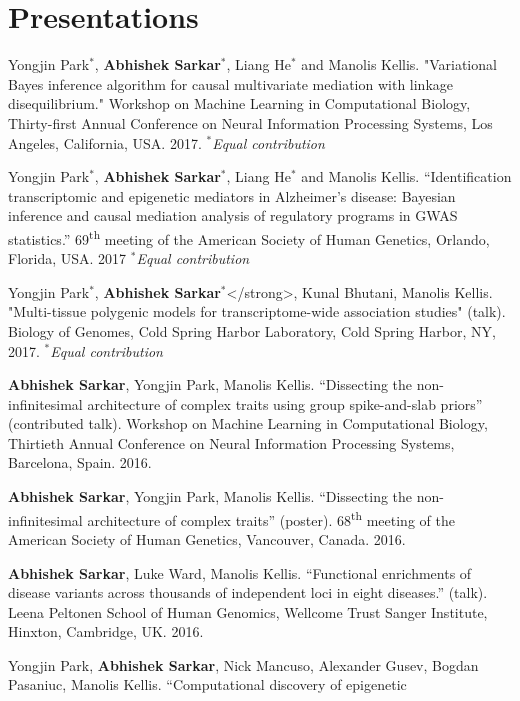 \documentclass{article}
\begin{document}
\section*{Presentations}
\begin{henum}
\item Yongjin Park$^*$, \textbf{Abhishek Sarkar$^*$}, Liang He$^*$ and Manolis
  Kellis. "Variational Bayes inference algorithm for causal multivariate
  mediation with linkage disequilibrium." Workshop on Machine Learning in
  Computational Biology, Thirty-first Annual Conference on Neural Information
  Processing Systems, Los Angeles, California, USA. 2017. \emph{$^*$Equal contribution}
\item Yongjin Park$^*$, \textbf{Abhishek Sarkar$^*$}, Liang He$^*$ and Manolis
  Kellis. ``Identification transcriptomic and epigenetic mediators in
  Alzheimer's disease: Bayesian inference and causal mediation analysis of
  regulatory programs in GWAS statistics.'' 69\textsuperscript{th} meeting of
  the American Society of Human Genetics, Orlando, Florida, USA. 2017 \emph{$^*$Equal contribution}
\item Yongjin Park$^*$, \textbf{Abhishek Sarkar$^*$}</strong>, Kunal Bhutani,
  Manolis Kellis. "Multi-tissue polygenic models for transcriptome-wide
  association studies" (talk). Biology of Genomes, Cold Spring Harbor
  Laboratory, Cold Spring Harbor, NY, 2017. \emph{$^*$Equal contribution}
\item \textbf{Abhishek Sarkar}, Yongjin Park, Manolis Kellis. ``Dissecting the
  non-infinitesimal architecture of complex traits using group spike-and-slab
  priors'' (contributed talk). Workshop on Machine Learning in Computational
  Biology, Thirtieth Annual Conference on Neural Information Processing
  Systems, Barcelona, Spain. 2016.
\item \textbf{Abhishek Sarkar}, Yongjin Park, Manolis Kellis. ``Dissecting the
  non-infinitesimal architecture of complex traits'' (poster).
  68\textsuperscript{th} meeting of the American Society of Human Genetics,
  Vancouver, Canada. 2016.
\item \textbf{Abhishek Sarkar}, Luke Ward, Manolis Kellis. ``Functional
  enrichments of disease variants across thousands of independent loci in eight
  diseases.'' (talk). Leena Peltonen School of Human Genomics, Wellcome Trust
  Sanger Institute, Hinxton, Cambridge, UK. 2016.
\item Yongjin Park, \textbf{Abhishek Sarkar}, Nick Mancuso, Alexander Gusev,
  Bogdan Pasaniuc, Manolis Kellis. ``Computational discovery of epigenetic

\end{henum}
\end{document}
